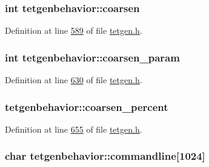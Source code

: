 \subsubsection[{\texorpdfstring{coarsen}{coarsen}}]{\setlength{\rightskip}{0pt plus 5cm}int tetgenbehavior\+::coarsen}\hypertarget{classtetgenbehavior_a58032e83757a8447015fd99d7053db8c}{}\label{classtetgenbehavior_a58032e83757a8447015fd99d7053db8c}


Definition at line \hyperlink{tetgen_8h_source_l00589}{589} of file \hyperlink{tetgen_8h_source}{tetgen.\+h}.

\subsubsection[{\texorpdfstring{coarsen\+\_\+param}{coarsen_param}}]{\setlength{\rightskip}{0pt plus 5cm}int tetgenbehavior\+::coarsen\+\_\+param}\hypertarget{classtetgenbehavior_a7280448201faf01cb571b2d1d09941f1}{}\label{classtetgenbehavior_a7280448201faf01cb571b2d1d09941f1}


Definition at line \hyperlink{tetgen_8h_source_l00630}{630} of file \hyperlink{tetgen_8h_source}{tetgen.\+h}.

\subsubsection[{\texorpdfstring{coarsen\+\_\+percent}{coarsen_percent}}]{ tetgenbehavior\+::coarsen\+\_\+percent}\hypertarget{classtetgenbehavior_ac9aa3f69cf550eb2ee81fc0cae2fb444}{}\label{classtetgenbehavior_ac9aa3f69cf550eb2ee81fc0cae2fb444}


Definition at line \hyperlink{tetgen_8h_source_l00655}{655} of file \hyperlink{tetgen_8h_source}{tetgen.\+h}.

\subsubsection[{\texorpdfstring{commandline}{commandline}}]{\setlength{\rightskip}{0pt plus 5cm}char tetgenbehavior\+::commandline\mbox{[}1024\mbox{]}}\hypertarget{classtetgenbehavior_a56dcfc2ab395c63b7f99d84b2cd1f4e8}{}\label{classtetgenbehavior_a56dcfc2ab395c63b7f99d84b2cd1f4e8}


